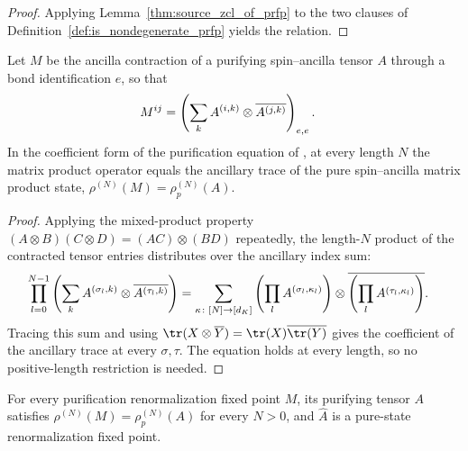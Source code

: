 \begin{proof}
    \leanok
    Applying Lemma~\ref{thm:source_zcl_of_prfp} to the two clauses of
    Definition~\ref{def:is_nondegenerate_prfp} yields the relation.
\end{proof}

\begin{lemma}
    \label{thm:mpo_eq_purification_density}
    \leanok
    Let $M$ be the ancilla contraction of a purifying spin--ancilla tensor $A$
    through a bond identification $e$, so that
    \begin{align}
        M^{ij}
         & =
        \left(\sum_{k} A^{(i,k)}\otimes
        \overline{A^{(j,k)}}\right)_{e,e}.
        \notag
    \end{align}
    In the coefficient form of the purification equation of
    \cite[line~751]{Cirac2016MPDO_arXiv}, at every length $N$ the matrix
    product operator equals the ancillary trace of the pure spin--ancilla
    matrix product state, $\rho^{(N)}(M)=\rho^{(N)}_p(A)$.
\end{lemma}

\begin{proof}\leanok
    Applying the mixed-product property
    $(A\otimes B)(C\otimes D)=(AC)\otimes(BD)$ repeatedly, the length-$N$
    product of the contracted tensor entries distributes over the ancillary
    index sum:
    \begin{align}
        \prod_{l=0}^{N-1}
        \left(\sum_{k}
        A^{(\sigma_l,k)}
        \otimes
        \overline{A^{(\tau_l,k)}}\right)
         & =
        \sum_{\kappa\colon[N]\to[d_K]}
        \left(\prod_l A^{(\sigma_l,\kappa_l)}\right)
        \otimes
        \overline{
            \left(\prod_l A^{(\tau_l,\kappa_l)}\right)
        }.
        \notag
    \end{align}
    Tracing this sum and using
    $\tr(X\otimes\overline Y)=\tr(X) \overline{\tr(Y)}$ gives the coefficient
    of the ancillary trace at every $\sigma,\tau$. The equation holds at every
    length, so no positive-length restriction is needed.
\end{proof}

\begin{lemma}
    \label{thm:prfp_has_purification_rfp_witness}
    \leanok
    For every purification renormalization fixed point $M$, its purifying
    tensor $A$ satisfies $\rho^{(N)}(M)=\rho^{(N)}_p(A)$ for every $N>0$,
    and $\widehat A$ is a pure-state renormalization fixed point.
\end{lemma}

